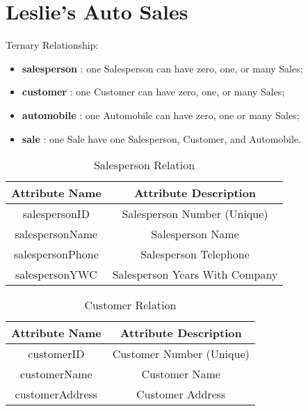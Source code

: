\chapter{Leslie's Auto Sales}

Ternary Relationship:
\begin{itemize}
	\item{\textbf{salesperson} : one Salesperson can have zero, one, or many Sales;}
	\item{\textbf{customer} : one Customer can have zero, one, or many Sales;}
	\item{\textbf{automobile} : one Automobile can have zero, one or many Sales;}
	\item{\textbf{sale} : one Sale have one Salesperson, Customer, and Automobile.}
\end{itemize}

\begin{table}[H]
	\begin{center}
		\begin{tabular}{|c|c|}
			\hline
			\textbf{Attribute Name} & \textbf{Attribute Description} \\ \hline
			salespersonID & Salesperson Number (Unique) \\ \hline
			salespersonName & Salesperson Name \\ \hline
			salespersonPhone & Salesperson Telephone \\ \hline
			salespersonYWC & Salesperson Years With Company \\ \hline
		\end{tabular}
		\caption{Salesperson Relation}
	\end{center}
\end{table}

\begin{table}[H]
	\begin{center}
		\begin{tabular}{|c|c|}
			\hline
			\textbf{Attribute Name} & \textbf{Attribute Description} \\ \hline
			customerID & Customer Number (Unique) \\ \hline
			customerName & Customer Name \\ \hline
			customerAddress & Customer Address \\ \hline
		\end{tabular}
		\caption{Customer Relation}
	\end{center}
\end{table}


